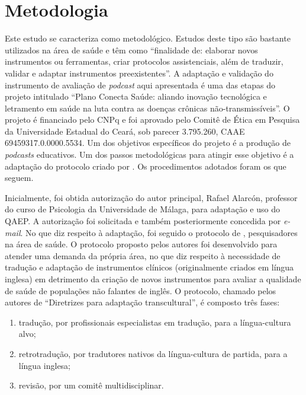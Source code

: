 \section{Metodologia}\label{sec-metodologia}

Este estudo se caracteriza como metodológico. Estudos deste tipo são bastante utilizados na área de saúde e têm como \enquote{finalidade de: elaborar novos instrumentos ou ferramentas, criar protocolos assistenciais, além de traduzir, validar e adaptar instrumentos preexistentes}\cite[p. 1]{galvao2022}. A adaptação e validação do instrumento de avaliação de \textit{podcast} aqui apresentada é uma das etapas do projeto intitulado \enquote{Plano Conecta Saúde: aliando inovação tecnológica e letramento em saúde na luta contra as doenças crônicas não-transmissíveis}. O projeto é financiado pelo CNPq e foi aprovado pelo Comitê de Ética em Pesquisa da Universidade Estadual do Ceará, sob parecer 3.795.260, CAAE 69459317.0.0000.5534. Um dos objetivos específicos do projeto é a produção de \textit{podcasts} educativos. Um dos passos metodológicas para atingir esse objetivo é a adaptação do protocolo criado por \textcite{alarcon2020}. Os procedimentos adotados foram os que seguem.

Inicialmente, foi obtida autorização do autor principal, Rafael Alarcón, professor do curso de Psicologia da Universidade de Málaga, para adaptação e uso do QAEP. A autorização foi solicitada e também posteriormente concedida por \textit{e-mail}. No que diz respeito à adaptação, foi seguido o protocolo de \textcite{guillemin1993}, pesquisadores na área de saúde. O protocolo proposto pelos autores foi desenvolvido para atender uma demanda da própria área, no que diz respeito à necessidade de tradução e adaptação de instrumentos clínicos (originalmente criados em língua inglesa) em detrimento da criação de novos instrumentos para avaliar a qualidade de saúde de populações não falantes de inglês. O protocolo, chamado pelos autores de \enquote{Diretrizes para adaptação transcultural}, é composto três fases: 
\begin{enumerate}[label=(\alph*)]
	\item tradução, por profissionais especialistas em tradução, para a língua-cultura alvo;
	\item retrotradução, por tradutores nativos da língua-cultura de partida, para a língua inglesa;
	\item revisão, por um comitê multidisciplinar.
\end{enumerate}


